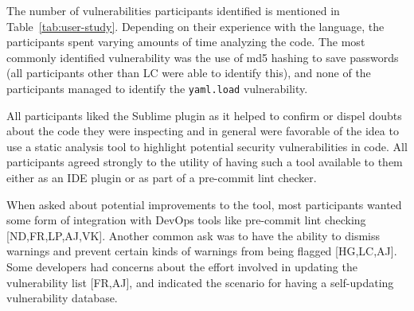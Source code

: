 The number of vulnerabilities participants identified is mentioned in Table~\ref{tab:user-study}. Depending on their experience with the language, the participants spent varying amounts of time analyzing the code. The most commonly identified vulnerability was the use of md5 hashing to save passwords (all participants other than LC were able to identify this), and none of the participants managed to identify the \texttt{yaml.load} vulnerability. 

All participants liked the Sublime plugin as it helped to confirm or dispel doubts about the code they were inspecting and in general were favorable of the idea to use a static analysis tool to highlight potential security vulnerabilities in code. All participants agreed strongly to the utility of having such a tool available to them either as an IDE plugin or as part of a pre-commit lint checker. 

When asked about potential improvements to the tool, most participants wanted some form of integration with DevOps tools like pre-commit lint checking [ND,FR,LP,AJ,VK]. Another common ask was to have the ability to dismiss warnings and prevent certain kinds of warnings from being flagged [HG,LC,AJ]. Some developers had concerns about the effort involved in updating the vulnerability list [FR,AJ], and indicated the scenario for having a self-updating vulnerability database.


